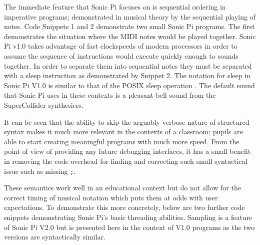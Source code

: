 \documentclass[11pt, abstracton, twoside]{scrartcl}
\begin{document}
The immediate feature that Sonic Pi focuses on is sequential ordering in 
imperative programs; demonstrated in musical theory by the sequential playing 
of notes. Code Snippets 1 and 2 demonstrate two small Sonic Pi programs. The 
first demonstrates the situation where the MIDI notes would be played together. 
Sonic Pi v1.0 takes advantage of fast clockspeeds of modern processors in order 
to assume the sequence of instructions would execute quickly enough 
to sounds together. In order to separate them into sequential notes they must 
be separated with a sleep instruction as demonstrated by Snippet 2. The notation 
for sleep in Sonic Pi V1.0 is similar to that of the POSIX sleep operation 
\cite{IG13}. The default sound that Sonic Pi uses in these contexts is a 
pleasant bell sound from the SuperCollider synthesiers.

It can be seen that the ability to skip the arguably verbose nature of 
structured syntax makes it much more relevant in the contexts of a classroom; 
pupils are able to start creating meaningful programs with much more speed. From 
the point of view of providing any future debugging interfaces, it has a small 
benefit in removing the code overhead for finding and correcting such small 
syntactical issue such as missing \texttt{;}. 

These semantics work well in an educational context but do not allow for the 
correct timing of musical notation which puts them at odds with user 
expectations. To demonstrate this more concretely, below are two further code 
snippets demonstrating Sonic Pi's basic threading abilities. Sampling is a 
feature of Sonic Pi V2.0 but is presented here in the context of V1.0 
programs as the two versions are syntactically similar.
\end{document}
